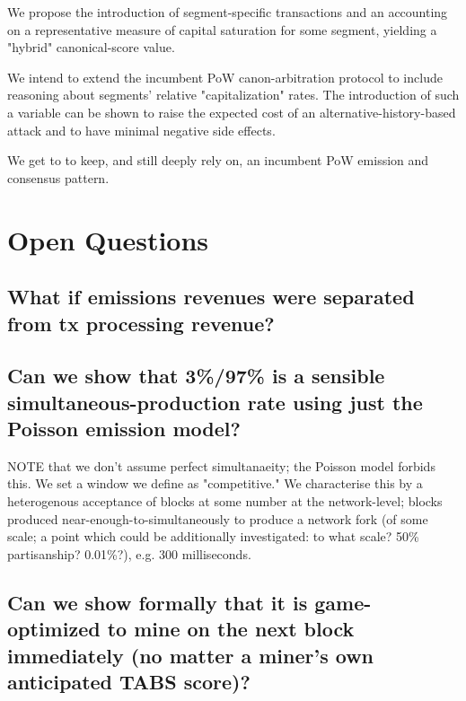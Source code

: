 \documentclass[11pt]{article}
\theoremstyle{plain}
\begin{document}
{We propose the introduction of segment-specific transactions and an accounting
on a representative measure of capital saturation for some segment, yielding a
"hybrid" canonical-score value.

We intend to extend the incumbent PoW canon-arbitration protocol to include
reasoning about segments' relative "capitalization" rates.
The introduction of such a variable can be shown to raise the expected cost of
an alternative-history-based attack and to have minimal negative side effects.

We get to to keep, and still deeply rely on, an incumbent PoW emission and
consensus pattern.





\section{\normalsize{Open Questions}}

\subsection{\small{What if emissions revenues were separated from tx processing
revenue?}}


\subsection{\small{Can we show that 3\%/97\% is a sensible
simultaneous-production rate using just the Poisson emission
model?}}

NOTE that we don't assume perfect simultanaeity; the Poisson model forbids this.
We set a window we define as "competitive." We characterise this by a
heterogenous acceptance of blocks at some number at the network-level; blocks
produced near-enough-to-simultaneously to produce a network fork (of some
scale; a point which could be additionally investigated: to what scale? 50\%
partisanship? 0.01\%?), e.g. 300 milliseconds.

\subsection{\small{Can we show formally that it is game-optimized to mine on
the next block immediately (no matter a miner's own anticipated TABS
score)?}}

}
\end{document}
